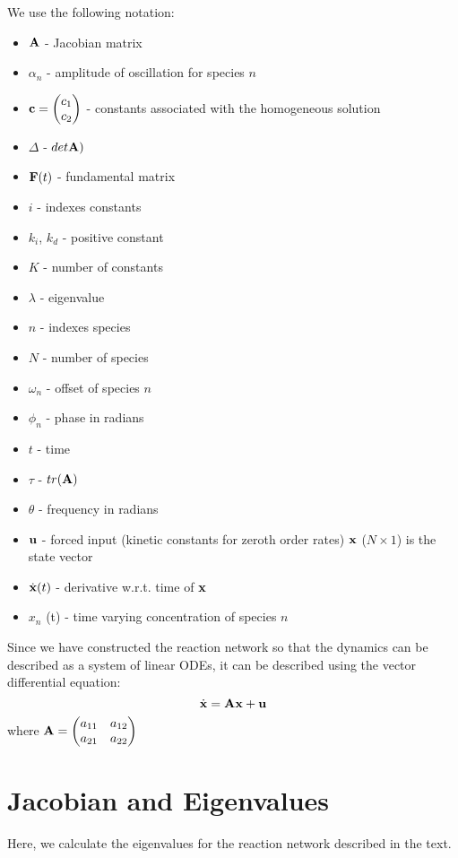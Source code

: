 \documentclass[11pt]{article}
\begin{document}
We use the following notation: 
\begin{itemize}
\item ${\bf A}$ - Jacobian matrix
\item $\alpha_n$ - amplitude of oscillation for species $n$
\item ${\bf c} = \begin{pmatrix} c_1 \\ c_2 \end{pmatrix}$ - constants associated with the homogeneous solution
\item $\Delta$ -
$det {\bf A})$
\item  ${\bf F} (t)$ - fundamental matrix
\item $i$ - indexes constants
\item $k_i$, $k_d$ -
positive constant 
\item $K$ - number of constants
\item $\lambda$ -
eigenvalue
\item $n$ - indexes species
\item $N$ - number of species
\item $\omega_n$ - offset of species $n$ 
\item $\phi_n$ - phase in radians
\item $t$ - time 
\item $\tau$ - $tr({\bf A})$ 
\item $\theta$ - frequency in
radians 
\item ${\bf u}$ - forced input (kinetic constants for zeroth order
rates)  ${\bf x}$ ($N \times 1$) is the state vector
\item $\dot{\bf x} (t)$ - derivative w.r.t. time of ${\bf x}$
\item $x_n$
(t) - time varying concentration of species $n$
\end{itemize}

    Since we have constructed the reaction network so that the dynamics can
be described as a system of linear ODEs, it can be described using the
vector differential equation: 
\begin{equation*}
\dot{\bf x} = {\bf A} {\bf x} + {\bf u}
\end{equation*} where
${\bf A} = \begin{pmatrix} a_{11} & a_{12} \\ a_{21} & a_{22} \\ \end{pmatrix}$

\section{Jacobian and Eigenvalues}
Here, we calculate the eigenvalues for the reaction network described
in the text.
\end{document}
